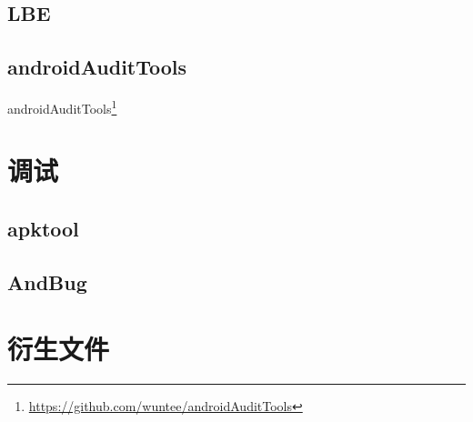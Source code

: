 \subsection{LBE}
\subsection{androidAuditTools}
androidAuditTools\footnote{\url{https://github.com/wuntee/androidAuditTools}}

\section{调试}
\label{Sec:debug}
\subsection{apktool}
\subsection{AndBug}

\section{衍生文件}
